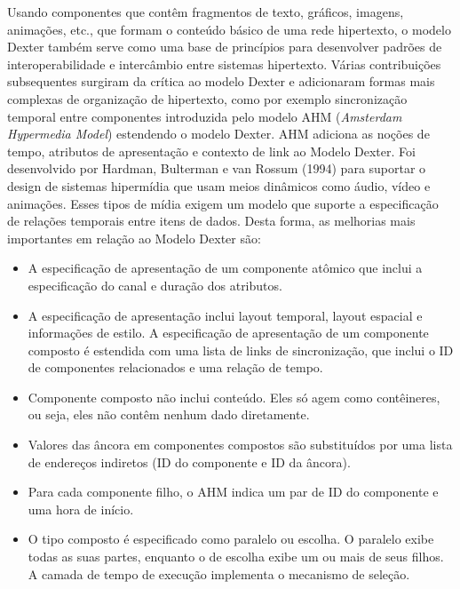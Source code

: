 Usando componentes que contêm fragmentos de texto, gráficos, imagens, animações, etc., que formam o conteúdo básico de uma rede hipertexto, o modelo Dexter também serve como uma base de princípios para desenvolver padrões de interoperabilidade e intercâmbio entre sistemas hipertexto. Várias contribuições subsequentes surgiram da crítica ao modelo Dexter e adicionaram formas mais complexas de organização de hipertexto, como por exemplo sincronização temporal entre componentes introduzida pelo modelo AHM (\emph{Amsterdam Hypermedia Model}) \cite{Hardman:1994:AHM:175235.175239} estendendo o modelo Dexter. AHM adiciona as noções de tempo, atributos de apresentação e contexto de link ao Modelo Dexter. Foi desenvolvido por Hardman, Bulterman e van Rossum (1994) para suportar o design de sistemas hipermídia que usam meios dinâmicos como áudio, vídeo e animações. Esses tipos de mídia exigem um modelo que suporte a especificação de relações temporais entre itens de dados. Desta forma, as melhorias mais importantes em relação ao Modelo Dexter são:

\begin{itemize}
 \item A especificação de apresentação de um componente atômico que inclui a especificação do canal e duração dos atributos.
 \item A especificação de apresentação inclui layout temporal, layout espacial e informações de estilo. A especificação de apresentação de um componente composto é estendida com uma lista de links de sincronização, que inclui o ID de componentes relacionados e uma relação de tempo.
 \item Componente composto não inclui conteúdo. Eles só agem como contêineres, ou seja, eles não contêm nenhum dado diretamente.
 \item Valores das âncora em componentes compostos são substituídos por uma lista de endereços indiretos (ID do componente e ID da âncora).
 \item Para cada componente filho, o AHM indica um par de ID do componente e uma hora de início.
 \item O tipo composto é especificado como paralelo ou escolha. O paralelo exibe todas as suas partes, enquanto o de escolha exibe um ou mais de seus filhos. A camada de tempo de execução implementa o mecanismo de seleção.
\end{itemize}

